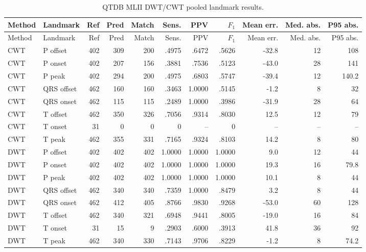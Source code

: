 \documentclass[11pt,a4paper]{article}
\begin{document}
\begin{landscape}
\begin{longtable}{llrrrrrrrrr}
\caption{QTDB MLII DWT/CWT pooled landmark results.}\label{tab:qtdbdwtcwt}\\
\toprule
Method & Landmark & Ref & Pred & Match & Sens. & PPV & $F_1$ & Mean err. & Med. abs. & P95 abs. \\
\midrule
\endfirsthead
\toprule
Method & Landmark & Ref & Pred & Match & Sens. & PPV & $F_1$ & Mean err. & Med. abs. & P95 abs. \\
\midrule
\endhead
CWT & P offset & 402 & 309 & 200 & .4975 & .6472 & .5626 & -32.8 & 12 & 108 \\
CWT & P onset & 402 & 207 & 156 & .3881 & .7536 & .5123 & -43.0 & 28 & 141 \\
CWT & P peak & 402 & 294 & 200 & .4975 & .6803 & .5747 & -39.4 & 12 & 140.2 \\
CWT & QRS offset & 462 & 160 & 160 & .3463 & 1.0000 & .5145 & -1.2 & 8 & 32 \\
CWT & QRS onset & 462 & 115 & 115 & .2489 & 1.0000 & .3986 & -31.9 & 28 & 64 \\
CWT & T offset & 462 & 350 & 326 & .7056 & .9314 & .8030 & 12.5 & 12 & 79 \\
CWT & T onset & 31 & 0 & 0 & 0 & -- & 0 & -- & -- & -- \\
CWT & T peak & 462 & 355 & 331 & .7165 & .9324 & .8103 & 14.2 & 8 & 80 \\
DWT & P offset & 402 & 402 & 402 & 1.0000 & 1.0000 & 1.0000 & 9.0 & 12 & 44 \\
DWT & P onset & 402 & 402 & 402 & 1.0000 & 1.0000 & 1.0000 & 19.3 & 16 & 79.8 \\
DWT & P peak & 402 & 402 & 402 & 1.0000 & 1.0000 & 1.0000 & 10.1 & 8 & 44 \\
DWT & QRS offset & 462 & 340 & 340 & .7359 & 1.0000 & .8479 & 3.2 & 8 & 44 \\
DWT & QRS onset & 462 & 412 & 405 & .8766 & .9830 & .9268 & -53.0 & 60 & 128 \\
DWT & T offset & 462 & 340 & 321 & .6948 & .9441 & .8005 & -19.0 & 16 & 84 \\
DWT & T onset & 31 & 15 & 9 & .2903 & .6000 & .3913 & 41.8 & 36 & 92 \\
DWT & T peak & 462 & 340 & 330 & .7143 & .9706 & .8229 & -1.2 & 8 & 74.2 \\
\bottomrule
\end{longtable}
\end{landscape}
\end{document}
